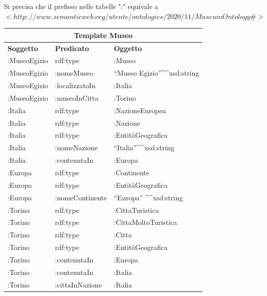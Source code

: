 \documentclass[12pt]{article}
\begin{document}
Si precisa che il prefisso nelle tabelle ":" equivale a \\$<http://www.semanticweb.org/utente/ontologies/2020/11/MuseumOntology\#>$
\newline
\begin{center}
 \begin{tabular}{ |p{3cm}|p{3cm}|p{3cm}| }
 \hline
 \multicolumn{3}{|c|}{\textbf{Template Museo}} \\
 \hline
 \textbf{Soggetto} & \textbf{Predicato} & \textbf{Oggetto}\\
 \hline
 :MuseoEgizio & rdf:type &:Museo   \\
  \hline
 :MuseoEgizio &   :nomeMuseo  & “Museo Egizio”\textasciicircum \textasciicircum xsd:string   \\
  \hline
 :MuseoEgizio & :localizzatoIn & :Italia\\
  \hline
 :MuseoEgizio &:museoInCitta & :Torino\\
  \hline
 :Italia & rdf:type & :NazioneEuropea\\
  \hline
 :Italia & rdf:type  & :Nazione   \\
  \hline
 :Italia & rdf:type  & :EntitàGeografica\\
  \hline
 :Italia & :nomeNazione  & “Italia”\textasciicircum \textasciicircum xsd:string   \\
  \hline
 :Italia & :contenutaIn  & :Europa\\
  \hline
 :Europa & rdf:type  & :Continente   \\
  \hline
 :Europa & rdf:type  & :EntitàGeografica\\
  \hline
 :Europa & :nomeContinente  & “Europa” \textasciicircum \textasciicircum xsd:string\\
  \hline
 :Torino &   rdf:type  & :CittaTuristica\\
  \hline
 :Torino & rdf:type  & :CittaMoltoTuristica   \\
  \hline
 :Torino & rdf:type  & :Citta\\
  \hline
 :Torino & rdf:type  & :EntitàGeografica   \\
  \hline
 :Torino & :contenutaIn  & :Europa\\
  \hline
 :Torino &   :contenutaIn  & :Italia\\
  \hline
 :Torino &   :cittaInNazione  & :Italia\\
 \hline
\end{tabular}
\end{center}
\end{document}
